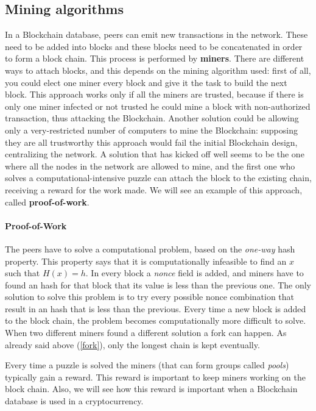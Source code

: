 \subsection{Mining algorithms}
In a Blockchain database, peers can emit new transactions in the network. These
need to be added into blocks and these blocks need to be concatenated in order
to form a block chain. This process is performed by \textbf{miners}.
There are different ways to attach blocks, and this depends on the mining
algorithm used: first of all, you could elect one miner every block and give
it the task to build the next block. This approach works only if all the miners
are trusted, because if there is only one miner infected or not trusted he
could mine a block with non-authorized transaction, thus attacking the
Blockchain. Another solution could be allowing only a very-restricted number of
computers to mine the Blockchain: supposing they are all trustworthy this
approach would fail the initial Blockchain design, centralizing the
network.
A solution that has kicked off well seems to be the one where all the nodes in
the network are allowed to mine, and the first one who solves a
computational-intensive puzzle can attach the block to the existing chain,
receiving a reward for the work made. We will see an example of this approach,
called \textbf{proof-of-work}.


\paragraph{Proof-of-Work}

The peers have to solve a computational problem, based on the \textit{one-way}
hash property. This property says that it is computationally infeasible to find
an $x$ such that $H(x) = h$.
In every block a \textit{nonce} field is added, and miners have to found an
hash for that block that its value is less than the previous one\cite{sok15}.
The only solution to solve this problem is to try every possible nonce
combination that result in an hash that is less than the previous. Every time a
new block is added to the block chain, the problem becomes computationally more
difficult to solve.
When two different miners found a different solution a fork can happen. As
already said above (\ref{fork}), only the longest chain is kept eventually.

Every time a puzzle is solved the miners (that can form groups called
\textit{pools}) typically gain a reward. This reward is important to keep miners
working on the block chain. Also, we will see how this reward is important when
a Blockchain database is used in a cryptocurrency.

